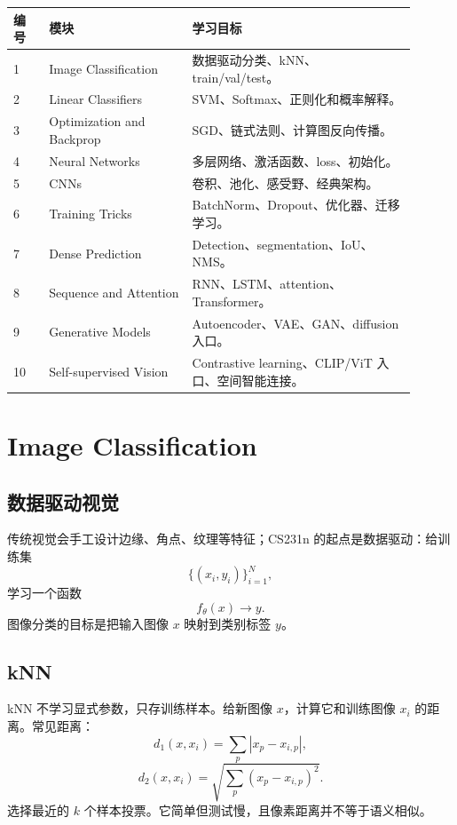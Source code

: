 \documentclass[11pt]{article}
\begin{document}
\begin{center}
\begin{tabular}{p{0.08\linewidth}p{0.32\linewidth}p{0.50\linewidth}}
\toprule
编号 & 模块 & 学习目标 \\
\midrule
1 & Image Classification & 数据驱动分类、kNN、train/val/test。 \\
2 & Linear Classifiers & SVM、Softmax、正则化和概率解释。 \\
3 & Optimization and Backprop & SGD、链式法则、计算图反向传播。 \\
4 & Neural Networks & 多层网络、激活函数、loss、初始化。 \\
5 & CNNs & 卷积、池化、感受野、经典架构。 \\
6 & Training Tricks & BatchNorm、Dropout、优化器、迁移学习。 \\
7 & Dense Prediction & Detection、segmentation、IoU、NMS。 \\
8 & Sequence and Attention & RNN、LSTM、attention、Transformer。 \\
9 & Generative Models & Autoencoder、VAE、GAN、diffusion 入口。 \\
10 & Self-supervised Vision & Contrastive learning、CLIP/ViT 入口、空间智能连接。 \\
\bottomrule
\end{tabular}
\end{center}

\section{Image Classification}

\subsection{数据驱动视觉}

传统视觉会手工设计边缘、角点、纹理等特征；CS231n 的起点是数据驱动：给训练集
\[
  \{(x_i,y_i)\}_{i=1}^{N},
\]
学习一个函数
\[
  f_\theta(x)\rightarrow y.
\]
图像分类的目标是把输入图像 $x$ 映射到类别标签 $y$。

\subsection{kNN}

kNN 不学习显式参数，只存训练样本。给新图像 $x$，计算它和训练图像 $x_i$ 的距离。常见距离：
\[
  d_1(x,x_i)=\sum_p |x_p-x_{i,p}|,
\]
\[
  d_2(x,x_i)=\sqrt{\sum_p (x_p-x_{i,p})^2}.
\]
选择最近的 $k$ 个样本投票。它简单但测试慢，且像素距离并不等于语义相似。
\end{document}
